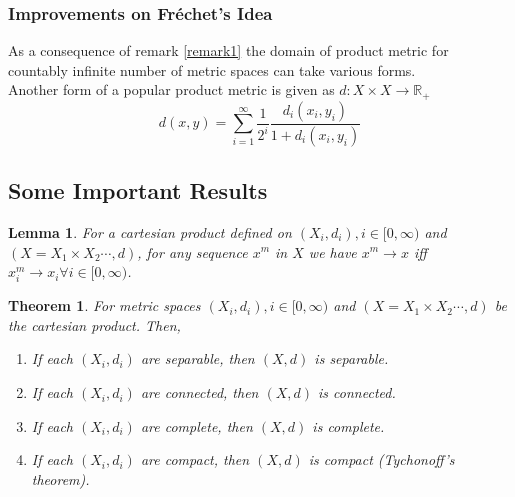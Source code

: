 \documentclass[12pt]{article}
\newcommand{\lightgreyb}{\color{lightgrey}}
\newtheorem{theorem}{Theorem}
\newtheorem{lemma}{Lemma}[section]
\begin{document}
\subsubsection*{\lightgreyb Improvements on Fréchet's Idea}

As a consequence of remark \ref{remark1} the domain of product metric for countably infinite number of metric spaces can take various forms. 
\\
Another form of a popular product metric is given as $d:X \times X \to \mathbb{R_+}$
\[
    \boxed{
        d(x, y) = \sum_{i=1}^{\infty} \frac{1}{2^i}\frac{d_i(x_i, y_i)}{1+d_i(x_i, y_i)}   
    }
\]

\subsection{Some Important Results}
\begin{lemma}
    \label{seq}
    For a cartesian product defined on $(X_i, d_i), i \in [0, \infty)$ and $(X = X_1 \times X_2 \dotsb, d)$, for any sequence ${x^m}$ in $X$ we have $x^m \to x$ iff $x^m_i \to x_i \forall i \in [0, \infty)$.
\end{lemma}
\vspace{0.4cm}
\begin{theorem}
    For metric spaces $(X_i, d_i), i \in [0, \infty)$ and $(X = X_1 \times X_2 \dotsb, d)$ be the cartesian product. Then,
    \begin{enumerate}
        \item If each $(X_i, d_i)$ are separable, then $(X, d)$ is separable.
        \item If each $(X_i, d_i)$ are connected, then $(X, d)$ is connected.
        \item If each $(X_i, d_i)$ are complete, then $(X, d)$ is complete.
        \item If each $(X_i, d_i)$ are compact, then $(X, d)$ is compact (Tychonoff's theorem).
    \end{enumerate}
\end{theorem}
\end{document}
